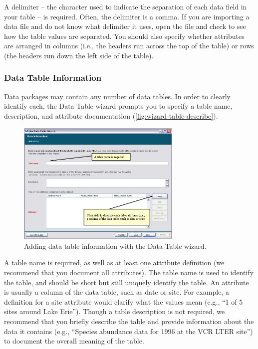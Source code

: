 A delimiter -- the character used to indicate the separation of each
data field in your table -- is required. Often, the delimiter is a
comma. If you are importing a data file and do not know what delimiter
it uses, open the file and check to see how the table values are
separated. You should also specify whether attributes are arranged in
columns (i.e., the headers run across the top of the table) or rows (the
headers run down the left side of the table). 

\subsubsection{Data Table Information} \label{sec:table-info}

Data packages may contain any number of data tables. In order to clearly
identify each, the Data Table wizard prompts you to specify a table
name, description, and attribute documentation
(\autoref{fig:wizard-table-describe}).

\begin{figure}
  \centering
    \includegraphics[width=0.7\textwidth]{images/wizard-table-describe.jpg}
  \caption{Adding data table information with the Data Table wizard.}
  \label{fig:wizard-table-describe}
\end{figure}

A table name is required, as well as at least one attribute definition
(we recommend that you document all attributes). The table name is used
to identify the table, and should be short but still uniquely identify
the table. An attribute is usually a column of the data table, such as
date or site. For example, a definition for a site attribute would
clarify what the values mean (e.g., ``1 of 5 sites around Lake Erie'').
Though a table description is not required, we recommend that you
briefly describe the table and provide information about the data it
contains (e.g., ``Species abundance data for 1996 at the VCR LTER site'')
to document the overall meaning of the table.

